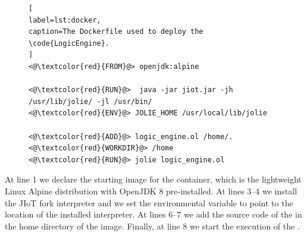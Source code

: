 \begin{figure}[b]
\begin{lstlisting}[
label=lst:docker,
caption=The Dockerfile used to deploy the \code{LogicEngine}.
]
<@\textcolor{red}{FROM}@> openjdk:alpine

<@\textcolor{red}{RUN}@>  java -jar jiot.jar -jh /usr/lib/jolie/ -jl /usr/bin/
<@\textcolor{red}{ENV}@> JOLIE_HOME /usr/local/lib/jolie

<@\textcolor{red}{ADD}@> logic_engine.ol /home/.
<@\textcolor{red}{WORKDIR}@> /home
<@\textcolor{red}{RUN}@> jolie logic_engine.ol
\end{lstlisting}
\end{figure}

%
At line 1 we declare the starting image for the container, which is the
lightweight Linux Alpine distribution with OpenJDK 8 pre-installed. At lines
3--4 we install the JIoT fork interpreter and we set the environmental
variable  to point to the location of the installed interpreter. At lines 6--7 we add the source code of the
 in the home directory of the image.
Finally, at line 8 we start the execution of the .
